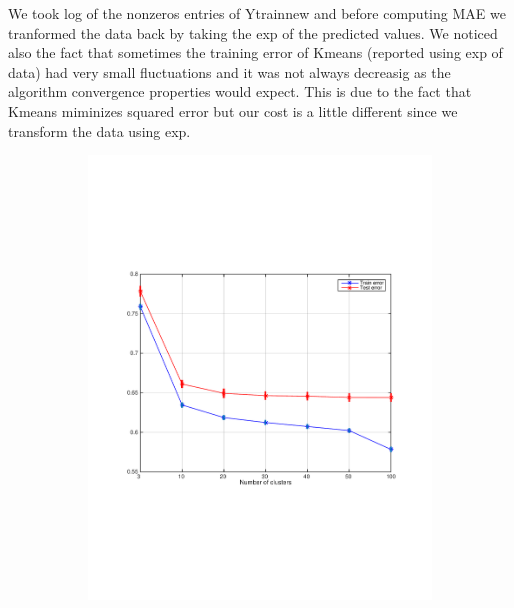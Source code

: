 We took log of the nonzeros entries of Ytrainnew and before 
computing MAE we tranformed the data back by taking the exp
of the predicted values.
We noticed also the fact that sometimes the training error of Kmeans
(reported using exp of data) had very small fluctuations and it was not always decreasig as the algorithm convergence properties would expect. This is due to the fact that Kmeans miminizes squared error but our cost is a little different since we transform the data using exp.

\begin{figure}[h]
  \centering
  \begin{subfigure}[b]{0.45\textwidth}
   \includegraphics[width=\textwidth]{figures/kmeans_train_test.pdf}
    \caption{}
  \end{subfigure}
  \begin{subfigure}[b]{0.45\textwidth}

\end{subfigure}
\end{figure}
